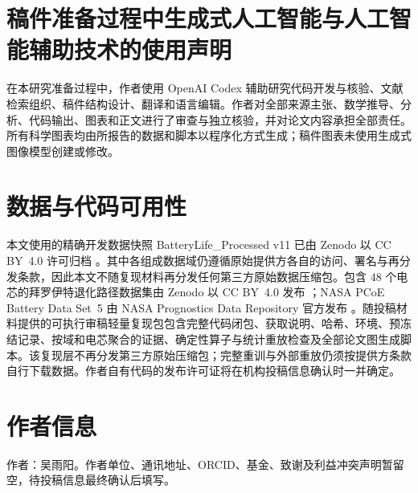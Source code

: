 \documentclass[UTF8,11pt]{ctexart}
\begin{document}
\section*{稿件准备过程中生成式人工智能与人工智能辅助技术的使用声明}

在本研究准备过程中，作者使用 OpenAI Codex 辅助研究代码开发与核验、文献检索组织、稿件结构设计、翻译和语言编辑。作者对全部来源主张、数学推导、分析、代码输出、图表和正文进行了审查与独立核验，并对论文内容承担全部责任。所有科学图表均由所报告的数据和脚本以程序化方式生成；稿件图表未使用生成式图像模型创建或修改。

\section*{数据与代码可用性}

本文使用的精确开发数据快照 BatteryLife\_Processed v11 已由 Zenodo 以 CC BY~4.0 许可归档 \citep{batterylife2026processed}。其中各组成数据域仍遵循原始提供方各自的访问、署名与再分发条款，因此本文不随复现材料再分发任何第三方原始数据压缩包。包含 $48$ 个电芯的拜罗伊特退化路径数据集由 Zenodo 以 CC BY~4.0 发布 \citep{roder2025degradationdata}；NASA PCoE Battery Data Set~5 由 NASA Prognostics Data Repository 官方发布 \citep{saha2007nasa}。随投稿材料提供的可执行审稿轻量复现包包含完整代码闭包、获取说明、哈希、环境、预冻结记录、按域和电芯聚合的证据、确定性算子与统计重放检查及全部论文图生成脚本。该复现层不再分发第三方原始压缩包；完整重训与外部重放仍须按提供方条款自行下载数据。作者自有代码的发布许可证将在机构投稿信息确认时一并确定。

\section*{作者信息}

作者：吴雨阳。作者单位、通讯地址、ORCID、基金、致谢及利益冲突声明暂留空，待投稿信息最终确认后填写。


\begingroup
{}

\endgroup
\end{document}
